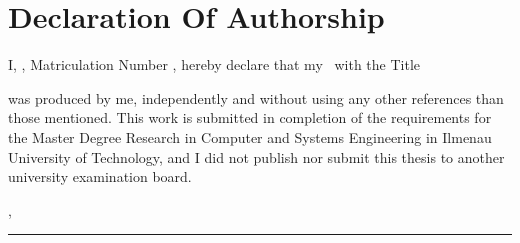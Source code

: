 \chapter*{Declaration Of Authorship}

\thispagestyle{empty}

\vspace{2cm}

\noindent I, \autor, Matriculation Number \matriculationnr, hereby declare that my \thesistype\ with the Title
\begin{quote}
\textit{\thesistitle}
\end{quote}
was produced by me, independently and without using any other references than those mentioned. This work is submitted in completion of the requirements for the Master Degree  Research in Computer and Systems Engineering in Ilmenau University of Technology, and I did not publish nor submit this thesis to another university examination board.

\vspace{6mm}
\location, \submissiontimestamp

\vspace{10mm}
\rule[-0.2cm]{6cm}{0.5pt} 

\textsc{\autor} 